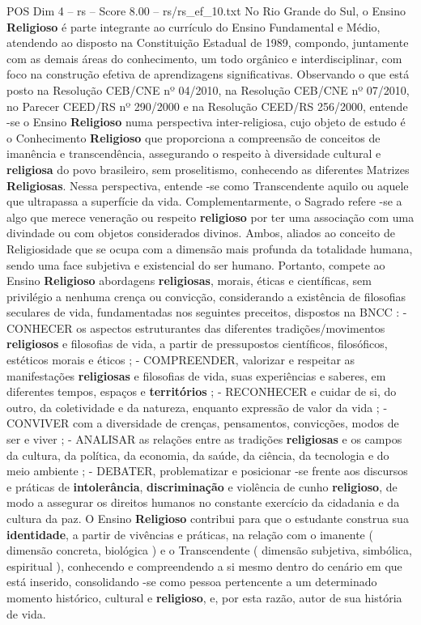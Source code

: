 \begin{textsample}{POS Dim 4 – rs – Score 8.00 – rs/rs\_ef\_10.txt}
No Rio Grande do Sul, o Ensino \textbf{Religioso} é parte integrante ao currículo do Ensino Fundamental e Médio, atendendo ao disposto na Constituição Estadual de 1989, compondo, juntamente com as demais áreas do conhecimento, um todo orgânico e interdisciplinar, com foco na construção efetiva de aprendizagens significativas.
Observando o que está posto na Resolução CEB/CNE nº 04/2010, na Resolução CEB/CNE nº 07/2010, no Parecer CEED/RS nº 290/2000 e na Resolução CEED/RS 256/2000, entende -se o Ensino \textbf{Religioso} numa perspectiva inter-religiosa, cujo objeto de estudo é o Conhecimento \textbf{Religioso} que proporciona a compreensão de conceitos de imanência e transcendência, assegurando o respeito à diversidade cultural e \textbf{religiosa} do povo brasileiro, sem proselitismo, conhecendo as diferentes Matrizes \textbf{Religiosas}.
Nessa perspectiva, entende -se como Transcendente aquilo ou aquele que ultrapassa a superfície da vida.
Complementarmente, o Sagrado refere -se a algo que merece veneração ou respeito \textbf{religioso} por ter uma associação com uma divindade ou com objetos considerados divinos.
Ambos, aliados ao conceito de Religiosidade que se ocupa com a dimensão mais profunda da totalidade humana, sendo uma face subjetiva e existencial do ser humano.
Portanto, compete ao Ensino \textbf{Religioso} abordagens \textbf{religiosas}, morais, éticas e científicas, sem privilégio a nenhuma crença ou convicção, considerando a existência de filosofias seculares de vida, fundamentadas nos seguintes preceitos, dispostos na BNCC : - CONHECER os aspectos estruturantes das diferentes tradições/movimentos \textbf{religiosos} e filosofias de vida, a partir de pressupostos científicos, filosóficos, estéticos morais e éticos ; - COMPREENDER, valorizar e respeitar as manifestações \textbf{religiosas} e filosofias de vida, suas experiências e saberes, em diferentes tempos, espaços e \textbf{territórios} ; - RECONHECER e cuidar de si, do outro, da coletividade e da natureza, enquanto expressão de valor da vida ; - CONVIVER com a diversidade de crenças, pensamentos, convicções, modos de ser e viver ; - ANALISAR as relações entre as tradições \textbf{religiosas} e os campos da cultura, da política, da economia, da saúde, da ciência, da tecnologia e do meio ambiente ; - DEBATER, problematizar e posicionar -se frente aos discursos e práticas de \textbf{intolerância}, \textbf{discriminação} e violência de cunho \textbf{religioso}, de modo a assegurar os direitos humanos no constante exercício da cidadania e da cultura da paz.
O Ensino \textbf{Religioso} contribui para que o estudante construa sua \textbf{identidade}, a partir de vivências e práticas, na relação com o imanente ( dimensão concreta, biológica ) e o Transcendente ( dimensão subjetiva, simbólica, espiritual ), conhecendo e compreendendo a si mesmo dentro do cenário em que está inserido, consolidando -se como pessoa pertencente a um determinado momento histórico, cultural e \textbf{religioso}, e, por esta razão, autor de sua história de vida.

\end{textsample}
